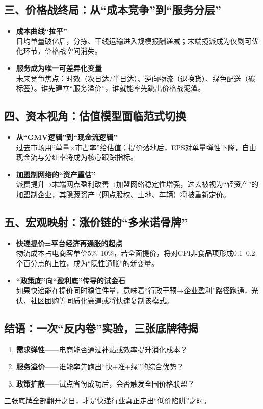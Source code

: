 \subsection{三、价格战终局：从“成本竞争”到“服务分层”}
\begin{itemize}
  \item \textbf{成本曲线“拉平”}  \\
  日均单量破亿后，分拣、干线运输进入规模报酬递减；末端揽派成为仅剩可优化环节，价格战空间消失。
  \item \textbf{服务成为唯一可差异化变量}  \\
  {\color{red}未来竞争焦点：时效（次日达/半日达）、逆向物流（退换货）、绿色配送（碳标签）。谁先建立“服务溢价”，谁就能率先跳出价格战泥潭。}
\end{itemize}

\subsection{四、资本视角：估值模型面临范式切换}
\begin{itemize}
  \item \textbf{从“GMV逻辑”到“现金流逻辑”}  \\
  过去市场用“单量×市占率”给估值；提价落地后，EPS对单量弹性下降，自由现金流与分红率将成为核心跟踪指标。
  \item \textbf{加盟制网络的“资产重估”}  \\
  派费提升→末端网点盈利改善→加盟网络稳定性增强，过去被视为“轻资产”的加盟制企业，其隐藏资产（网点股权、土地、车辆）将被重新定价。
\end{itemize}

\subsection{五、宏观映射：涨价链的“多米诺骨牌”}
\begin{itemize}
  \item \textbf{快递提价=平台经济再通胀的起点}  \\
  物流成本占电商客单价5\%–10\%，若全面提价，将对CPI非食品项形成0.1–0.2个百分点的上拉，成为“隐性通胀”的新变量。
  \item \textbf{“政策底”向“盈利底”传导的试金石}\\  
  如果快递能在提价同时稳住件量，意味着“行政干预→企业盈利”路径跑通，光伏、社区团购等同质化赛道或将快速复制该模式。
\end{itemize}

\subsection{结语：一次“反内卷”实验，三张底牌待揭}
\begin{enumerate}
  \item \textbf{需求弹性}——电商能否通过补贴或效率提升消化成本？
  \item \textbf{服务溢价}——谁能率先跑出“快+准+绿”的综合优势？
  \item \textbf{政策扩散}——试点省份成功后，会否触发全国价格联盟？
\end{enumerate}
三张底牌全部翻开之日，才是快递行业真正走出“低价陷阱”之时。



